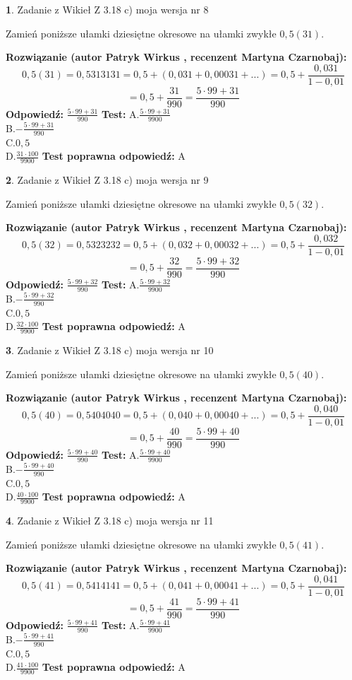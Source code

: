 \documentclass[12pt, a4paper]{article}
\theoremstyle{definition} %
\newtheorem{zad}{}
\newcommand{\zadStart}[1]{\begin{zad}#1\newline}
\newcommand{\zadStop}{\end{zad}}
\newcommand{\rozwStart}[2]{\noindent \textbf{Rozwiązanie (autor #1 , recenzent #2): }\newline}
\newcommand{\rozwStop}{\newline}
\newcommand{\odpStart}{\noindent \textbf{Odpowiedź:}\newline}
\newcommand{\odpStop}{\newline}
\newcommand{\testStart}{\noindent \textbf{Test:}\newline}
\newcommand{\testStop}{\newline}
\newcommand{\kluczStart}{\noindent \textbf{Test poprawna odpowiedź:}\newline}
\newcommand{\kluczStop}{\newline}
\begin{document}
\zadStart{Zadanie z Wikieł Z 3.18 c) moja wersja nr 8}

Zamień poniższe ułamki dziesiętne okresowe na ułamki zwykłe $0,5(31)$.
\zadStop
\rozwStart{Patryk Wirkus}{Martyna Czarnobaj}
$$0,5(31)=0,5313131=0,5+(0,031+0,00031+...)=0,5+\frac{0,031}{1-0,01}$$
$$=0,5+\frac{31}{990}=\frac{5\cdot99+31}{990}$$
\rozwStop
\odpStart
$\frac{5\cdot99+31}{990}$
\odpStop
\testStart
A.$\frac{5\cdot99+31}{9900}$\\ B.$-\frac{5\cdot99+31}{990}$\\ C.$0,5$\\ D.$\frac{31\cdot100}{9900}$
\testStop
\kluczStart
A
\kluczStop



\zadStart{Zadanie z Wikieł Z 3.18 c) moja wersja nr 9}

Zamień poniższe ułamki dziesiętne okresowe na ułamki zwykłe $0,5(32)$.
\zadStop
\rozwStart{Patryk Wirkus}{Martyna Czarnobaj}
$$0,5(32)=0,5323232=0,5+(0,032+0,00032+...)=0,5+\frac{0,032}{1-0,01}$$
$$=0,5+\frac{32}{990}=\frac{5\cdot99+32}{990}$$
\rozwStop
\odpStart
$\frac{5\cdot99+32}{990}$
\odpStop
\testStart
A.$\frac{5\cdot99+32}{9900}$\\ B.$-\frac{5\cdot99+32}{990}$\\ C.$0,5$\\ D.$\frac{32\cdot100}{9900}$
\testStop
\kluczStart
A
\kluczStop



\zadStart{Zadanie z Wikieł Z 3.18 c) moja wersja nr 10}

Zamień poniższe ułamki dziesiętne okresowe na ułamki zwykłe $0,5(40)$.
\zadStop
\rozwStart{Patryk Wirkus}{Martyna Czarnobaj}
$$0,5(40)=0,5404040=0,5+(0,040+0,00040+...)=0,5+\frac{0,040}{1-0,01}$$
$$=0,5+\frac{40}{990}=\frac{5\cdot99+40}{990}$$
\rozwStop
\odpStart
$\frac{5\cdot99+40}{990}$
\odpStop
\testStart
A.$\frac{5\cdot99+40}{9900}$\\ B.$-\frac{5\cdot99+40}{990}$\\ C.$0,5$\\ D.$\frac{40\cdot100}{9900}$
\testStop
\kluczStart
A
\kluczStop



\zadStart{Zadanie z Wikieł Z 3.18 c) moja wersja nr 11}

Zamień poniższe ułamki dziesiętne okresowe na ułamki zwykłe $0,5(41)$.
\zadStop
\rozwStart{Patryk Wirkus}{Martyna Czarnobaj}
$$0,5(41)=0,5414141=0,5+(0,041+0,00041+...)=0,5+\frac{0,041}{1-0,01}$$
$$=0,5+\frac{41}{990}=\frac{5\cdot99+41}{990}$$
\rozwStop
\odpStart
$\frac{5\cdot99+41}{990}$
\odpStop
\testStart
A.$\frac{5\cdot99+41}{9900}$\\ B.$-\frac{5\cdot99+41}{990}$\\ C.$0,5$\\ D.$\frac{41\cdot100}{9900}$
\testStop
\kluczStart
A
\kluczStop
\end{document}
